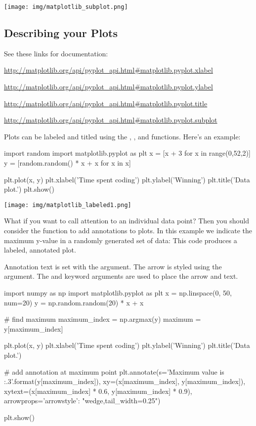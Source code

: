 \documentclass[11pt]{cselabheader}
\begin{document}
\begin{center}
  \texttt{[image: img/matplotlib\_subplot.png]}
\end{center}

\subsection{Describing your Plots}
See these links for documentation:
\begin{center}
\url{http://matplotlib.org/api/pyplot_api.html#matplotlib.pyplot.xlabel}

\url{http://matplotlib.org/api/pyplot_api.html#matplotlib.pyplot.ylabel}

\url{http://matplotlib.org/api/pyplot_api.html#matplotlib.pyplot.title}

\url{http://matplotlib.org/api/pyplot_api.html#matplotlib.pyplot.subplot}
\end{center}

Plots can be labeled and titled using the
,
,
and  functions.
Here's an example:

\begin{python3code}
import random
import matplotlib.pyplot as plt
x = [x + 3 for x in range(0,52,2)]
y = [random.random() * x + x for x in x]

plt.plot(x, y)
plt.xlabel('Time spent coding')
plt.ylabel('Winning')
plt.title('Data plot.')
plt.show()
\end{python3code}

\begin{center}
  \texttt{[image: img/matplotlib\_labeled1.png]}
\end{center}

What if you want to call attention to an individual data point? Then
you should consider the  function to add
annotations to plots.  In this example we indicate the maximum y-value
in a randomly generated set of data: This code produces a labeled,
annotated plot.

Annotation text is set with the  argument. The arrow
is styled using the  argument.  The
 and  keyword arguments are used
to place the arrow and text.

\begin{python3code}
import numpy as np
import matplotlib.pyplot as plt
x = np.linspace(0, 50, num=20)
y = np.random.random(20) * x + x

# find maximum
maximum_index = np.argmax(y)
maximum = y[maximum_index]

plt.plot(x, y)
plt.xlabel('Time spent coding')
plt.ylabel('Winning')
plt.title('Data plot.')

# add annotation at maximum point
plt.annotate(s='Maximum value is {:.3}'.format(y[maximum_index]),
             xy=(x[maximum_index], y[maximum_index]),
             xytext=(x[maximum_index] * 0.6, y[maximum_index] * 0.9),
             arrowprops={'arrowstyle': "wedge,tail_width=0.25"})

plt.show()
\end{python3code}
\end{document}
